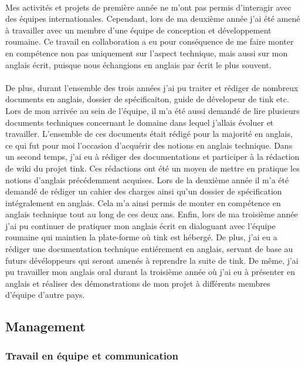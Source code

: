 \documentclass[12pt,a4paper]{report}
\begin{document}
\paragraph*{}Mes activités et projets de première année ne m'ont pas permis d'interagir avec des équipes internationales. Cependant, lors de ma deuxième année j'ai été amené à travailler avec un membre d'une équipe de conception et développement roumaine. Ce travail en collaboration a eu pour conséquence de me faire monter en compétence non pas uniquement sur l'aspect technique, mais aussi sur mon anglais écrit, puisque nous échangions en anglais par écrit le plus souvent.
\paragraph*{}De plus, durant l'ensemble des trois années j'ai pu traiter et rédiger de nombreux documents en anglais, dossier de spécificaiton, guide de dévelopeur de \gls{tink} etc. Lors de mon arrivée au sein de l'équipe, il m'a été aussi demandé de lire plusieurs documents techniques concernant le domaine dans lequel j'allais évoluer et travailler. L'ensemble de ces documents était rédigé pour la majorité en anglais, ce qui fut pour moi l'occasion d'acquérir des notions en anglais technique. Dans un second temps, j'ai eu à rédiger des documentations et participer à la rédaction de wiki du projet \gls{tink}. Ces rédactions ont été un moyen de mettre en pratique les notions d’anglais précédemment acquises. Lors de la deuxième année il m'a été demandé de rédiger un cahier des charges ainsi qu'un dossier de spécification intégralement en anglais. Cela m'a ainsi permis de monter en compétence en anglais technique tout au long de ces deux ans. Enfin, lors de ma troisième année j'ai pu continuer de pratiquer mon anglais écrit en dialoguant avec l'équipe roumaine qui maintien la plate-forme où \gls{tink} est hébergé. De plus, j'ai eu a rédiger une documentation technique entiérement en anglais, servant de base au futurs dévéloppeurs qui seront amenés à reprendre la suite de \gls{tink}. De même, j'ai pu travailler mon anglais oral durant la troisième année où j'ai eu à présenter en anglais et réaliser des démonstrations de mon projet à différents membres d'équipe d'autre pays.\\

\subsection{Management}
\subsubsection{Travail en équipe et communication}
\end{document}
